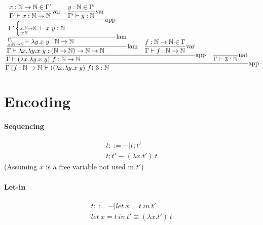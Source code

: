\documentclass{article}
\newcommand{\st}[3][]{\ensuremath{\displaystyle\frac{#3\hfill}{#2\hfill} \text{#1}}}
\newcommand{\N}{\ensuremath \mathbb N}
\newcommand{\lam}[2]{\ensuremath{\lambda#1.#2}}
\begin{document}
\begin{equation*}
    \st[app]{
        \Gamma\left\{f:\N\to\N\right. \vdash ((\lam{x}{\lam{y}{x\ y}})\ f)\ 3:\N
    }{
        \st[app]{
            \Gamma\vdash (\lam{x}{\lam{y}{x\ y}})\ f: \N\to\N
        }{
            \st[lam]{
                \Gamma\vdash \lam{x}{\lam{y}{x\ y}}: (\N\to\N)\to\N\to\N
            }{
                \st[lam]{
                    \substack{\Gamma,\hfill\\x:\N\to\N}\vdash \lam{y}{x\ y}:\N\to\N
                }{
                    \st[app]{
                        \Gamma' \left\{ \substack{\Gamma,\hfill\\x:\N\to\N,\\y:\N\hfill} \right. \vdash x\ y:\N
                    }{
                        \st[var]{
                            \Gamma'\vdash x:\N\to\N
                        }{
                            x:\N\to\N\in\Gamma'
                        }
                        \quad
                        \st[var]{
                            \Gamma'\vdash y:\N
                        }{
                            y:\N\in\Gamma'
                        }
                    }
                }
            }
            \quad
            \st[var]{
                \Gamma\vdash f:\N\to\N
            }{
                f:\N\to\N\in\Gamma
            }
        }
        \quad
        \st[nat]{
            \Gamma\vdash 3:\N
        }{
        }
    }
\end{equation*}

\section{Encoding}
\paragraph{Sequencing}
\begin{gather*}
    t ::= \cdots | t;t' \\
    t;t' \equiv (\lam{x}{t'})\ t
\end{gather*}
(Assuming $x$ is a free variable not used in $t'$)

\paragraph{Let-in}
\begin{gather*}
    t ::= \cdots | let\ x=t\ in\ t' \\
    let\ x=t\ in\ t' \equiv (\lam{x}{t'})\ t
\end{gather*}
\end{document}

